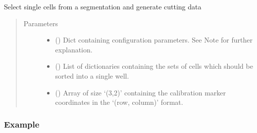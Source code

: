 \documentclass[a4paper,10pt,english,openany,oneside]{sphinxmanual}
\begin{document}
\begin{fulllineitems}
\label{\detokenize{pages/modules:lmd.lib.SegmentationLoader}}
\sphinxAtStartPar
Select single cells from a segmentation and generate cutting data
\begin{quote}\begin{description}
\item[{Parameters}] \leavevmode\begin{itemize}
\item {} 
\sphinxAtStartPar
{} () \textendash{} Dict containing configuration parameters. See Note for further explanation.

\item {} 
\sphinxAtStartPar
{} (\sphinxstyleliteralemphasis{\sphinxupquote{(}}\sphinxstyleliteralemphasis{\sphinxupquote{)}}) \textendash{} List of dictionaries containing the sets of cells which should be sorted into a single well.

\item {} 
\sphinxAtStartPar
{} () \textendash{} Array of size ‘(3,2)’ containing the calibration marker coordinates in the ‘(row, column)’ format.

\end{itemize}

\end{description}\end{quote}
\subsubsection*{Example}

\begin{sphinxVerbatim}[commandchars=\\\{\}]
   
   
   


\end{sphinxVerbatim}
\end{fulllineitems}
\end{document}
